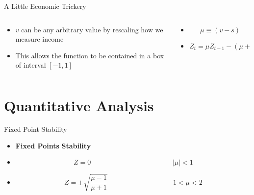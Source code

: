 \documentclass{beamer}
\begin{document}
\begin{frame}{A Little Economic Trickery}
	\begin{columns}
		\begin{column}{0.5\textwidth}
			\begin{itemize}
				\item
					\(v\) can be any arbitrary value by rescaling how we measure income
				\item
					This allows the function to be contained in a box of interval \([-1,1]\)
			\end{itemize}
		\end{column}
		\begin{column}{0.5\textwidth}
			\begin{itemize}
				\item
					\begin{equation*}
						\mu\equiv(v-s)
					\end{equation*}

				\item
					\begin{equation*}
						Z_t=\mu Z_{t-1}-(\mu+1)Z^3_{t-1}
					\end{equation*}
			\end{itemize}
		\end{column}
	\end{columns}
\end{frame}

\section{Quantitative Analysis}
\begin{frame}{Fixed Point Stability}
	\begin{itemize}
		\item 
			\textbf{Fixed Points}\hspace{5cm} \textbf{Stability}
		\item
			\begin{equation*}
				Z=0 \hspace{5cm} \lvert \mu \rvert<1
			\end{equation*}

		\item
			\begin{equation*}
				Z=\pm\sqrt{\frac{\mu-1}{\mu+1}} \hspace{4cm} 1<\mu<2
			\end{equation*}
	\end{itemize}
\end{frame}
\end{document}
